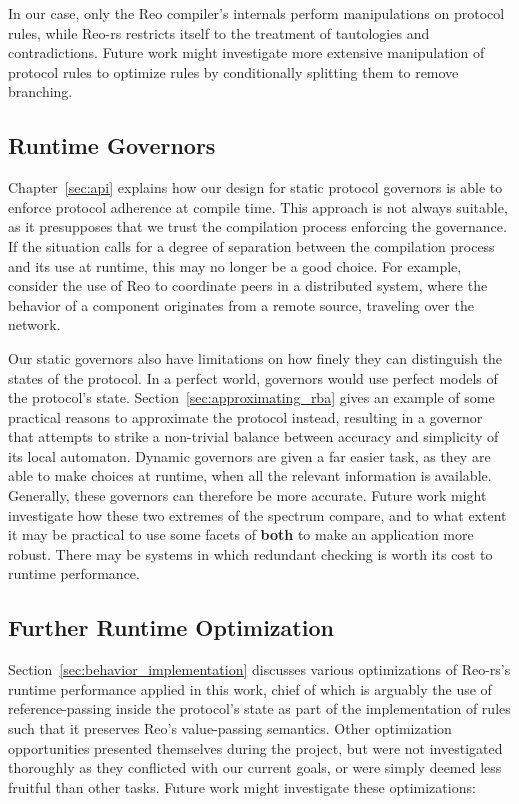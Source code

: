 In our case, only the Reo compiler's internals perform manipulations on protocol rules, while Reo-rs restricts itself to the treatment of tautologies and contradictions. Future work might investigate more extensive manipulation of protocol rules to optimize rules by conditionally splitting them to remove branching.

\subsection{Runtime Governors}
Chapter~\ref{sec:api} explains how our design for static protocol governors is able to enforce protocol adherence at compile time. This approach is not always suitable, as it presupposes that we trust the compilation process enforcing the governance. If the situation calls for a degree of separation between the compilation process and its use at runtime, this may no longer be a good choice. For example, consider the use of Reo to coordinate peers in a distributed system, where the behavior of a component originates from a remote source, traveling over the network.

Our static governors also have limitations on how finely they can distinguish the states of the protocol. In a perfect world, governors would use perfect models of the protocol's state. Section~\ref{sec:approximating_rba} gives an example of some practical reasons to approximate the protocol instead, resulting in a governor that attempts to strike a non-trivial balance between accuracy and simplicity of its local automaton. Dynamic governors are given a far easier task, as they are able to make choices at runtime, when all the relevant information is available. Generally, these governors can therefore be more accurate. Future work might investigate how these two extremes of the spectrum compare, and to what extent it may be practical to use some facets of \textbf{both} to make an application more robust. There may be systems in which redundant checking is worth its cost to runtime performance.

\subsection{Further Runtime Optimization}
Section~\ref{sec:behavior_implementation} discusses various optimizations of Reo-rs's runtime performance applied in this work, chief of which is arguably the use of reference-passing inside the protocol's state as part of the implementation of rules such that it preserves Reo's value-passing semantics. Other optimization opportunities presented themselves during the project, but were not investigated thoroughly as they conflicted with our current goals, or were simply deemed less fruitful than other tasks. Future work might investigate these optimizations:

